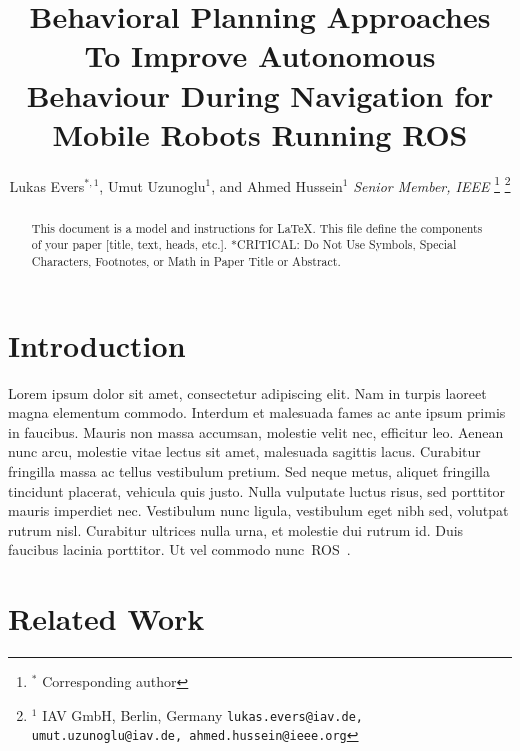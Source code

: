 \documentclass[letterpaper, 10pt, conference]{ieeeconf}
\begin{document}
\title{Behavioral Planning Approaches To Improve Autonomous Behaviour During
	Navigation for Mobile Robots Running ROS}

\author{Lukas Evers$^{*,1}$, Umut Uzunoglu$^{1}$, and Ahmed Hussein$^{1}$ \textit{Senior Member, IEEE}%
    \thanks{$^{*}$ Corresponding author }%
    \thanks{$^{1}$ IAV GmbH, Berlin, Germany \newline
		{\tt\small lukas.evers@iav.de, umut.uzunoglu@iav.de, ahmed.hussein@ieee.org}}%
}

\maketitle
\pagestyle{empty}


\begin{abstract}

This document is a model and instructions for \LaTeX.
This file define the components of your paper [title, text, heads, etc.]. 
*CRITICAL: Do Not Use Symbols, Special Characters, Footnotes, or Math in Paper Title or Abstract.

\end{abstract}


\section{Introduction}
\label{sec:Introduction}

 Lorem ipsum dolor sit amet, consectetur adipiscing elit. Nam in turpis laoreet magna elementum commodo. Interdum et malesuada fames ac ante ipsum primis in faucibus. Mauris non massa accumsan, molestie velit nec, efficitur leo. Aenean nunc arcu, molestie vitae lectus sit amet, malesuada sagittis lacus. Curabitur fringilla massa ac tellus vestibulum pretium. Sed neque metus, aliquet fringilla tincidunt placerat, vehicula quis justo. Nulla vulputate luctus risus, sed porttitor mauris imperdiet nec. Vestibulum nunc ligula, vestibulum eget nibh sed, volutpat rutrum nisl. Curabitur ultrices nulla urna, et molestie dui rutrum id. Duis faucibus lacinia porttitor. Ut vel commodo nunc~\gls{ROS}~\cite{quigley2009}.


\section{Related Work}
\label{sec:RelatedWork}
\end{document}
